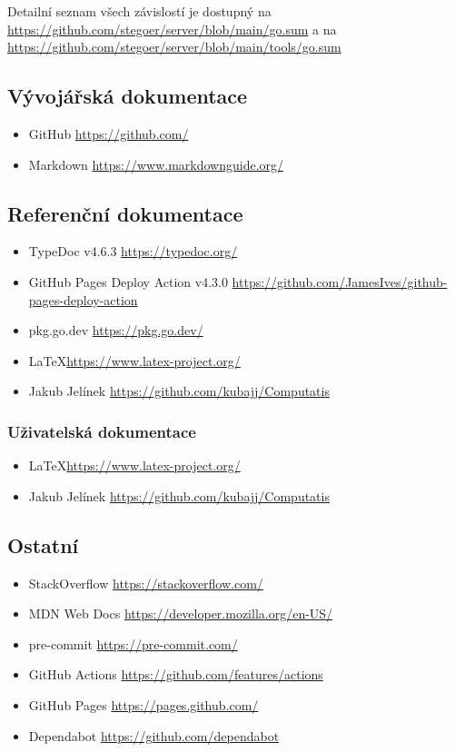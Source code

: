 Detailní seznam všech závislostí je dostupný na
\url{https://github.com/stegoer/server/blob/main/go.sum}
a na \url{https://github.com/stegoer/server/blob/main/tools/go.sum}

\subsection{Vývojářská dokumentace}\label{subsec:dev-dokumentace}

\begin{itemize}
    \item GitHub \url{https://github.com/}
    \item Markdown \url{https://www.markdownguide.org/}
\end{itemize}

\subsection{Referenční dokumentace}\label{subsec:ref-dokumentace}

\begin{itemize}
    \item TypeDoc v4.6.3 \url{https://typedoc.org/}
    \item GitHub Pages Deploy Action v4.3.0 \url{https://github.com/JamesIves/github-pages-deploy-action}
    \item pkg.go.dev \url{https://pkg.go.dev/}
    \item \LaTeX \url{https://www.latex-project.org/}
    \item Jakub Jelínek \url{https://github.com/kubajj/Computatis}
\end{itemize}

\subsubsection{Uživatelská dokumentace}\label{subsec:user-dokumentace}

\begin{itemize}
    \item \LaTeX \url{https://www.latex-project.org/}
    \item Jakub Jelínek \url{https://github.com/kubajj/Computatis}
\end{itemize}

\subsection{Ostatní}\label{subsec:ostatni}

\begin{itemize}
    \item StackOverflow \url{https://stackoverflow.com/}
    \item MDN Web Docs \url{https://developer.mozilla.org/en-US/}
    \item pre-commit \url{https://pre-commit.com/}
    \item GitHub Actions \url{https://github.com/features/actions}
    \item GitHub Pages \url{https://pages.github.com/}
    \item Dependabot \url{https://github.com/dependabot}
\end{itemize}

